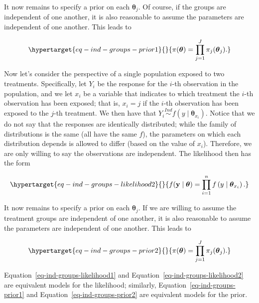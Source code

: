 \documentclass[
  letterpaper,
  DIV=11,
  numbers=noendperiod]{scrreprt}
\theoremstyle{definition}
\theoremstyle{definition}
\theoremstyle{plain}
\theoremstyle{remark}
\begin{document}
It now remains to specify a prior on each \(\boldsymbol{\theta}_j\). Of
course, if the groups are independent of one another, it is also
reasonable to assume the parameters are independent of one another. This
leads to

\begin{equation}\protect\hypertarget{eq-ind-groups-prior1}{}{\pi(\boldsymbol{\theta}) = \prod_{j=1}^{J} \pi_j(\boldsymbol{\theta}_j).}\label{eq-ind-groups-prior1}\end{equation}

Now let's consider the perspective of a single population exposed to two
treatments. Specifically, let \(Y_i\) be the response for the \(i\)-th
observation in the population, and we let \(x_i\) be a variable that
indicates to which treatment the \(i\)-th observation has been exposed;
that is, \(x_i = j\) if the \(i\)-th observation has been exposed to the
\(j\)-th treatment. We then have that
\(Y_i \stackrel{Ind}{\sim} f\left(y \mid \boldsymbol{\theta}_{x_i}\right)\).
Notice that we do not say that the responses are identically
distributed; while the family of distributions is the same (all have the
same \(f\)), the parameters on which each distribution depends is
allowed to differ (based on the value of \(x_i\)). Therefore, we are
only willing to say the observations are independent. The likelihood
then has the form

\begin{equation}\protect\hypertarget{eq-ind-groups-likelihood2}{}{f(\mathbf{y} \mid \boldsymbol{\theta}) = \prod_{i=1}^{n} f\left(y \mid \boldsymbol{\theta}_{x_i}\right).}\label{eq-ind-groups-likelihood2}\end{equation}

It now remains to specify a prior on each \(\boldsymbol{\theta}_j\). If
we are willing to assume the treatment groups are independent of one
another, it is also reasonable to assume the parameters are independent
of one another. This leads to

\begin{equation}\protect\hypertarget{eq-ind-groups-prior2}{}{\pi(\boldsymbol{\theta}) = \prod_{j=1}^{J} \pi_j(\boldsymbol{\theta}_j).}\label{eq-ind-groups-prior2}\end{equation}

Equation~\ref{eq-ind-groups-likelihood1} and
Equation~\ref{eq-ind-groups-likelihood2} are equivalent models for the
likelihood; similarly, Equation~\ref{eq-ind-groups-prior1} and
Equation~\ref{eq-ind-groups-prior2} are equivalent models for the prior.
\end{document}
